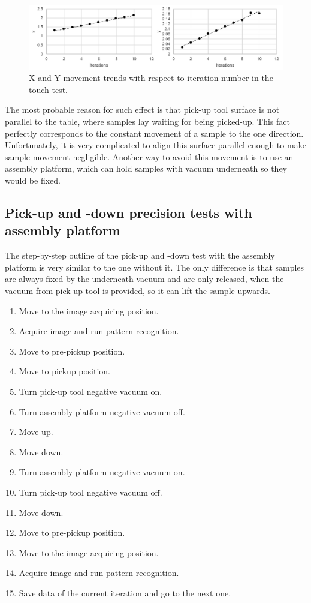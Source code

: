 \begin{figure}[ht]\centering
\includegraphics[width=1\linewidth]{Data/Precision_tests/XY_touch_movement.png}
\caption{X and Y movement trends with respect to iteration number in the touch test.}
\label{fig:touch_move}
\end{figure}

The most probable reason for such effect is that pick-up tool surface is not parallel to the table, where samples lay waiting for being picked-up. This fact perfectly corresponds to the constant movement of a sample to the one direction. Unfortunately, it is very complicated to align this surface parallel enough to make sample movement negligible. Another way to avoid this movement is to use an assembly platform, which can hold samples with vacuum underneath so they would be fixed.

\subsection{Pick-up and -down precision tests with assembly platform}

The step-by-step outline of the pick-up and -down test with the assembly platform is very similar to the one without it. The only difference is that samples are always fixed by the underneath vacuum and are only released, when the vacuum from pick-up tool is provided, so it can lift the sample upwards.

\begin{enumerate}
\setlength\itemsep{-0.5em}
\item Move to the image acquiring position.
\item Acquire image and run pattern recognition.
\item Move to pre-pickup position.
\item Move to pickup position.
\item Turn pick-up tool negative vacuum on.
\item Turn assembly platform negative vacuum off.
\item Move up.
\item Move down.
\item Turn assembly platform negative vacuum on.
\item Turn pick-up tool negative vacuum off.
\item Move down.
\item Move to pre-pickup position.
\item Move to the image acquiring position.
\item Acquire image and run pattern recognition.
\item Save data of the current iteration and go to the next one.
\end{enumerate}

